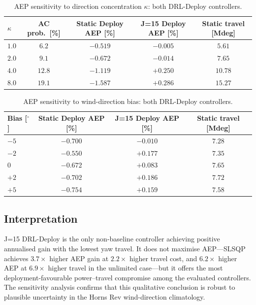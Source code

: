 \documentclass{article}
\begin{document}
\begin{table}[h]
\centering
\caption{AEP sensitivity to direction concentration $\kappa$: both DRL-Deploy controllers.}
\label{tab:aep_kappa}
\small
\begin{tabular}{lcccc}
\toprule
$\kappa$ & AC prob.\ [\%] & Static Deploy AEP [\%] & J=15 Deploy AEP [\%] & Static travel [Mdeg] \\
\midrule
$1.0$ & $6.2$ & $-0.519$ & $-0.005$ & $5.61$ \\
$2.0$ & $9.1$ & $-0.672$ & $-0.014$ & $7.65$ \\
$4.0$ & $12.8$ & $-1.119$ & $+0.250$ & $10.78$ \\
$8.0$ & $19.1$ & $-1.587$ & $+0.286$ & $15.27$ \\
\bottomrule
\end{tabular}
\end{table}

\begin{table}[h]
\centering
\caption{AEP sensitivity to wind-direction bias: both DRL-Deploy controllers.}
\label{tab:aep_bias}
\small
\begin{tabular}{lccc}
\toprule
Bias [$^\circ$] & Static Deploy AEP [\%] & J=15 Deploy AEP [\%] & Static travel [Mdeg] \\
\midrule
$-5$ & $-0.700$ & $-0.010$ & $7.28$ \\
$-2$ & $-0.550$ & $+0.177$ & $7.35$ \\
$0$  & $-0.672$ & $+0.083$ & $7.65$ \\
$+2$ & $-0.702$ & $+0.186$ & $7.72$ \\
$+5$ & $-0.754$ & $+0.159$ & $7.58$ \\
\bottomrule
\end{tabular}
\end{table}

\subsection{Interpretation}

J=15 DRL-Deploy is the only non-baseline controller achieving positive annualised gain with the lowest yaw travel. It does not maximise AEP---SLSQP achieves $3.7{\times}$ higher AEP gain at $2.2{\times}$ higher travel cost, and $6.2{\times}$ higher AEP at $6.9{\times}$ higher travel in the unlimited case---but it offers the most deployment-favourable power--travel compromise among the evaluated controllers. The sensitivity analysis confirms that this qualitative conclusion is robust to plausible uncertainty in the Horns Rev wind-direction climatology.
\end{document}
